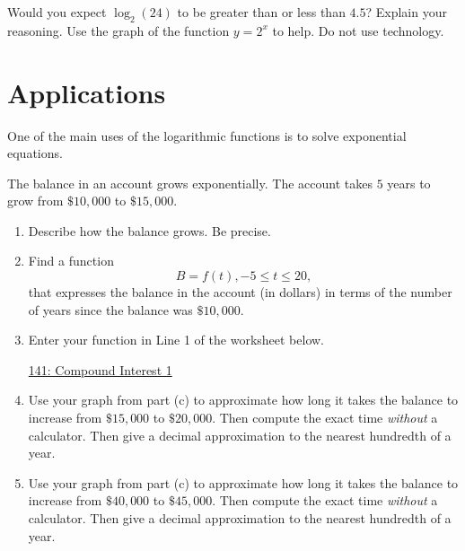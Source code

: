 \documentclass{ximera}
\begin{document}
\begin{question} \label{Q4:LogF}
Would you expect $\log_2(24)$ to be greater than or less than $4.5$? Explain your reasoning. Use the graph of the function $y=2^x$ to help. Do not use technology.
\end{question}



\section{Applications}

One of the main uses of the logarithmic functions is to solve exponential equations.


\begin{question}  \label{Q:dfehyyh5h}
The balance in an account grows exponentially. The account takes $5$ years to grow from $\$10,000$ to $\$15,000$. 

\begin{enumerate}
\item Describe how the balance grows. Be precise.

\item Find a function 
\[
B = f(t), -5\leq t \leq 20,
\]
that expresses the balance in the account (in dollars) in terms of the number of years since the balance was $\$10,000$.

\item Enter your function in Line 1 of the worksheet below. 

\begin{onlineOnly}
    \begin{center}
\end{center}
\end{onlineOnly}


\href{https://www.desmos.com/calculator/zszhcct8zb}{141: Compound Interest 1}

\item Use your graph from part (c) to approximate how long it takes the balance to increase from $\$15,000$ to $\$20,000$. Then compute the exact time \emph{without} a calculator. Then give a decimal approximation to the nearest hundredth of a year.

\item Use your graph from part (c) to approximate how long it takes the balance to increase from $\$40,000$ to $\$45,000$. Then compute the exact time \emph{without} a calculator. Then give a decimal approximation to the nearest hundredth of a year.


\end{enumerate}
\end{question}
\end{document}
